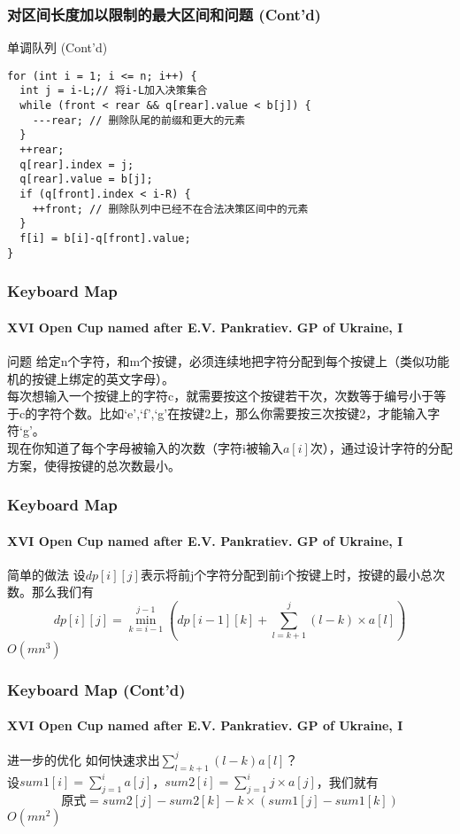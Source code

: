 \documentclass[hyperref={unicode=true}]{beamer}
\theoremstyle{definition}
\theoremstyle{proof}
\begin{document}
\begin{frame}[fragile]\frametitle{对区间长度加以限制的最大区间和问题 (Cont'd)}
  \begin{exampleblock}{单调队列 (Cont'd)}
    \begin{verbatim}
for (int i = 1; i <= n; i++) {
  int j = i-L;// 将i-L加入决策集合
  while (front < rear && q[rear].value < b[j]) {
    ---rear; // 删除队尾的前缀和更大的元素
  }
  ++rear;
  q[rear].index = j;
  q[rear].value = b[j];
  if (q[front].index < i-R) {
    ++front; // 删除队列中已经不在合法决策区间中的元素
  }
  f[i] = b[i]-q[front].value;
}
    \end{verbatim}
  \end{exampleblock}
\end{frame}

\begin{frame}\frametitle{Keyboard Map}
  \framesubtitle{XVI Open Cup named after E.V. Pankratiev. GP of Ukraine, I}
  \begin{block}{问题}
    给定n个字符，和m个按键，必须连续地把字符分配到每个按键上（类似功能机的按键上绑定的英文字母）。\\
    每次想输入一个按键上的字符c，就需要按这个按键若干次，次数等于编号小于等于c的字符个数。比如`e',`f',`g'在按键2上，那么你需要按三次按键2，才能输入字符`g'。\\
    现在你知道了每个字母被输入的次数（字符i被输入$a[i]$次），通过设计字符的分配方案，使得按键的总次数最小。
  \end{block}
\end{frame}

\begin{frame}\frametitle{Keyboard Map}
  \framesubtitle{XVI Open Cup named after E.V. Pankratiev. GP of Ukraine, I}
  \begin{alertblock}{简单的做法}
    设$dp[i][j]$表示将前j个字符分配到前i个按键上时，按键的最小总次数。那么我们有
    \[dp[i][j] = \min_{k=i-1}^{j-1}{(dp[i-1][k] + \sum_{l=k+1}^{j}(l-k)\times a[l])}\]
    $O(mn^3)$
  \end{alertblock}
\end{frame}

\begin{frame}\frametitle{Keyboard Map (Cont'd)}
  \framesubtitle{XVI Open Cup named after E.V. Pankratiev. GP of Ukraine, I}
  \begin{alertblock}{进一步的优化}
    如何快速求出$\sum_{l=k+1}^{j}(l-k)a[l]$？\\
    \pause{}设$sum1[i] = \sum_{j=1}^i a[j]$，$sum2[i] = \sum_{j=1}^i{j}\times a[j]$，我们就有
    \[\text{原式}=sum2[j]-sum2[k]-k \times (sum1[j]-sum1[k])\]
    $O(mn^2)$
  \end{alertblock}
\end{frame}
\end{document}
